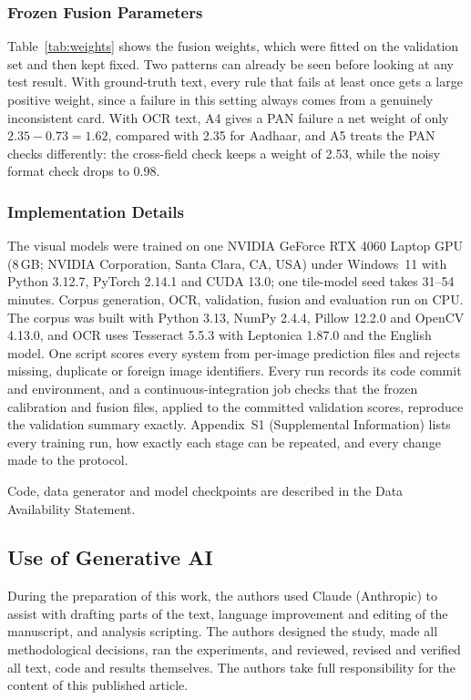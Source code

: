 \documentclass[12pt]{article}
\begin{document}
\subsubsection{Frozen Fusion Parameters}

Table~\ref{tab:weights} shows the fusion weights, which were fitted on the validation set and then kept fixed. Two patterns can already be seen before looking at any test result. With ground-truth text, every rule that fails at least once gets a large positive weight, since a failure in this setting always comes from a genuinely inconsistent card. With OCR text, A4 gives a PAN failure a net weight of only $2.35-0.73=1.62$, compared with 2.35 for Aadhaar, and A5 treats the PAN checks differently: the cross-field check keeps a weight of 2.53, while the noisy format check drops to 0.98.


\subsubsection{Implementation Details}
\label{subsec:implementation}

The visual models were trained on one NVIDIA GeForce RTX 4060 Laptop GPU
(8\,GB; NVIDIA Corporation, Santa Clara, CA, USA) under Windows~11 with Python 3.12.7, PyTorch 2.14.1 and
CUDA 13.0; one tile-model seed takes 31--54 minutes. Corpus
generation, OCR, validation, fusion and evaluation run on CPU. The
corpus was built with Python 3.13, NumPy 2.4.4, Pillow 12.2.0 and
OpenCV 4.13.0, and OCR uses Tesseract 5.5.3 with Leptonica 1.87.0 and
the English model. One script scores every system from per-image
prediction files and rejects missing, duplicate or foreign image
identifiers. Every run records its code commit and environment, and a
continuous-integration job checks that the frozen calibration and
fusion files, applied to the committed validation scores, reproduce the
validation summary exactly. Appendix~S1 (Supplemental Information) lists every
training run, how exactly each stage can be repeated, and every change
made to the protocol.

Code, data generator and model checkpoints are described in the Data
Availability Statement.

\subsection{Use of Generative AI}
\label{subsec:ai}

During the preparation of this work, the authors used Claude
(Anthropic) to assist with drafting parts of the text, language
improvement and editing of the manuscript, and analysis scripting. The
authors designed the study, made all methodological decisions, ran the
experiments, and reviewed, revised and verified all text, code and
results themselves. The authors take full responsibility for the content of this
published article.
\end{document}
